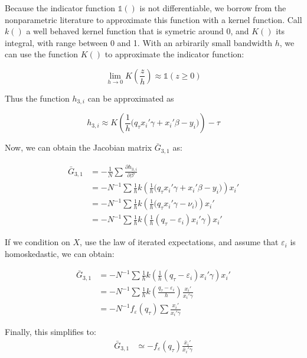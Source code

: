 \documentclass[
  12pt,
  oneside]{article}
\begin{document}
Because the indicator function \(\mathbb{1}()\) is not differentiable,
we borrow from the nonparametric literature to approximate this function
with a kernel function. Call \(k()\) a well behaved kernel function that
is symetric around 0, and \(K()\) its integral, with range between 0 and
1. With an arbirarily small bandwidth \(h\), we can use the function
\(K()\) to approximate the indicator function:

\[
\lim_{h\rightarrow 0} K\left(\frac{z}{h}\right) \approx \mathbb{1}(z\geq 0)
\]

Thus the function \(h_{3,i}\) can be approximated as

\[h_{3,i} \approx K\left( \frac{1}{h} \Big( q_\tau x_i'\gamma +x_i'\beta - y_i  \Big) \right) - \tau
\]

Now, we can obtain the Jacobian matrix \(\bar G_{3,1}\) as:

\[\begin{aligned}
\bar G_{3,1} &= -\frac{1}{N} \sum \frac{\partial h_{3,i}}{\partial \beta'} \\
             &= -N^{-1} \sum \frac{1}{h} k\left( \frac{1}{h} \Big( q_\tau x_i'\gamma +x_i'\beta - y_i  \Big) \right) x_i' \\ 
             &= -N^{-1} \sum \frac{1}{h} k\left( \frac{1}{h} \big( q_\tau x_i'\gamma - \nu_i \big)   \right) x_i'  \\
             &= -N^{-1} \sum \frac{1}{h} k\left( \frac{1}{h} ( q_\tau - \varepsilon_i ) x_i'\gamma  \right) x_i'  
\end{aligned}
\]

If we condition on \(X\), use the law of iterated expectations, and
assume that \(\varepsilon_i\) is homoskedastic, we can obtain:

\[\begin{aligned}
\bar G_{3,1} &= -N^{-1} \sum \frac{1}{h} k\left( \frac{1}{h} ( q_\tau - \varepsilon_i ) x_i'\gamma  \right) x_i'  \\
             &= -N^{-1} \sum \frac{1}{h} k\left( \frac{q_\tau - \varepsilon_i}{h}  \right)  \frac{x_i'}{x_i'\gamma}  \\
             &= -N^{-1} f_\varepsilon (q_\tau) \sum  \frac{x_i'}{x_i'\gamma}  
\end{aligned}
\]

Finally, this simplifies to: \[\begin{aligned}
\bar G_{3,1} &\simeq -  f_\varepsilon (q_\tau) \frac{\bar x_i'}{ \bar x_i' \gamma} 
\end{aligned}
\]
\end{document}
